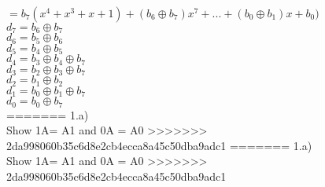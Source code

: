 \documentclass{assignment}
\begin{document}
\begin{problemlist}
\begin{problem}
\begin{answer}
$=b_7(x^4+x^3+x+1)+(b_6\oplus b_7)x^7+...+(b_0\oplus b_1)x+b_0)$\\
$d_7=b_6\oplus b_7$\\
$d_6=b_5\oplus b_6$\\
$d_5=b_4\oplus b_5$\\
$d_4=b_3\oplus b_4 \oplus b_7$\\
$d_3=b_2\oplus b_3 \oplus b_7$\\
$d_2=b_1\oplus b_2$\\
$d_1=b_0\oplus b_1 \oplus b_7$\\
$d_0=b_0 \oplus b_7$\\
=======
1.a)\\
Show 1A= A1
and 0A = A0
>>>>>>> 2da998060b35c6d8e2cb4ecca8a45c50dba9adc1
=======
1.a)\\
Show 1A= A1
and 0A = A0
>>>>>>> 2da998060b35c6d8e2cb4ecca8a45c50dba9adc1


\end{answer}
\end{problem}
\end{problemlist}
\end{document}
